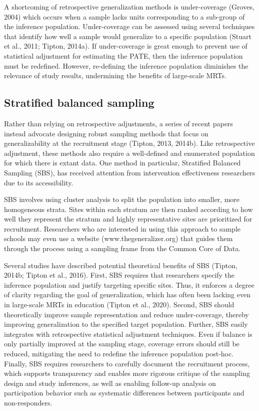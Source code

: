 \documentclass[
  english,
  man,floatsintext]{apa6}
\begin{document}
A shortcoming of retrospective generalization methods is under-coverage (Groves, 2004) which occurs when a sample lacks units corresponding to a sub-group of the inference population. Under-coverage can be assessed using several techniques that identify how well a sample would generalize to a specific population (Stuart et al., 2011; Tipton, 2014a). If under-coverage is great enough to prevent use of statistical adjustment for estimating the PATE, then the inference population must be redefined. However, re-defining the inference population diminishes the relevance of study results, undermining the benefits of large-scale MRTs.

\hypertarget{stratified-balanced-sampling}{%
\subsection{Stratified balanced sampling}\label{stratified-balanced-sampling}}

Rather than relying on retrospective adjustments, a series of recent papers instead advocate designing robust sampling methods that focus on generalizability at the recruitment stage (Tipton, 2013, 2014b). Like retrospective adjustment, these methods also require a well-defined and enumerated population for which there is extant data.
One method in particular, Stratified Balanced Sampling (SBS), has received attention from intervention effectiveness researchers due to its accessibility.

SBS involves using cluster analysis to split the population into smaller, more homogeneous strata. Sites within each stratum are then ranked according to how well they represent the stratum and highly representative sites are prioritized for recruitment.
Researchers who are interested in using this approach to sample schools may even use a website (www.thegeneralizer.org) that guides them through the process using a sampling frame from the Common Core of Data.

Several studies have described potential theoretical benefits of SBS (Tipton, 2014b; Tipton et al., 2016). First, SBS requires that researchers specify the inference population and justify targeting specific sites. Thus, it enforces a degree of clarity regarding the goal of generalization, which has often been lacking even in large-scale MRTs in education (Tipton et al., 2020). Second, SBS should theoretically improve sample representation and reduce under-coverage, thereby improving generalization to the specified target population. Further, SBS easily integrates with retrospective statistical adjustment techniques. Even if balance is only partially improved at the sampling stage, coverage errors should still be reduced, mitigating the need to redefine the inference population post-hoc.
Finally, SBS requires researchers to carefully document the recruitment process, which supports transparency and enables more rigorous critique of the sampling design and study inferences, as well as enabling follow-up analysis on participation behavior such as systematic differences between participants and non-responders.
\end{document}
